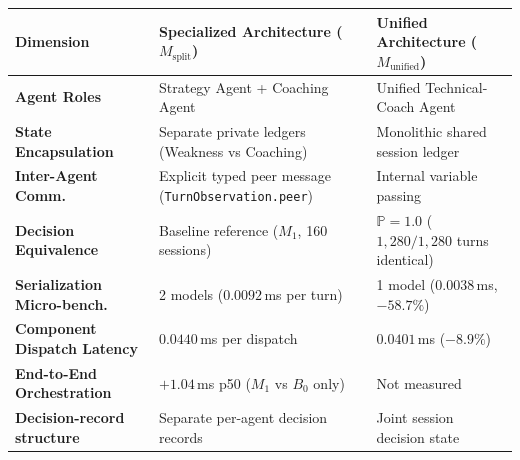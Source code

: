 \begin{tabular}{lp{3.7cm}p{3.7cm}}
\toprule
\textbf{Dimension} & \textbf{Specialized Architecture ($M_{\text{split}}$)} & \textbf{Unified Architecture ($M_{\text{unified}}$)} \\
\midrule
\textbf{Agent Roles} & Strategy Agent + Coaching Agent & Unified Technical-Coach Agent \\
\textbf{State Encapsulation} & Separate private ledgers (Weakness vs Coaching) & Monolithic shared session ledger \\
\textbf{Inter-Agent Comm.} & Explicit typed peer message (\texttt{TurnObservation.peer}) & Internal variable passing \\
\textbf{Decision Equivalence} & Baseline reference ($M_1$, 160 sessions) & $\mathbb{P} = 1.0$ ($1{,}280/1{,}280$ turns identical) \\
\textbf{Serialization Micro-bench.} & 2 models ($0.0092$\,ms per turn) & 1 model ($0.0038$\,ms, $-58.7\%$) \\
\textbf{Component Dispatch Latency} & $0.0440$\,ms per dispatch & $0.0401$\,ms ($-8.9\%$) \\
\textbf{End-to-End Orchestration} & $+1.04$\,ms p50 ($M_1$ vs $B_0$ only) & Not measured \\
\textbf{Decision-record structure} & Separate per-agent decision records & Joint session decision state \\
\bottomrule
\end{tabular}
